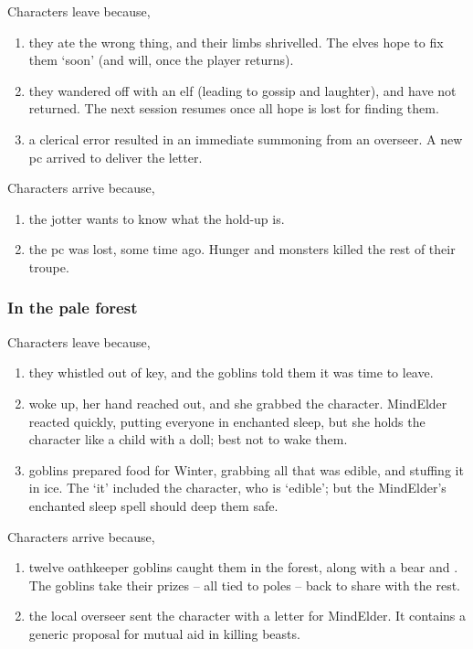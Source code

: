 \begin{multicols}{2}
{  Characters leave because,

  \begin{enumerate}
    \item
    they ate the wrong thing, and their limbs shrivelled.
    The elves hope to fix them `soon' (and will, once the player returns).
    \item
    they wandered off with an elf (leading to gossip and laughter), and have not returned.
    The next session resumes once all hope is lost for finding them.
    \item
    a clerical error resulted in an immediate summoning from an overseer.
    A new \gls{pc} arrived to deliver the letter.
  \end{enumerate}

  Characters arrive because,

  \begin{enumerate}
    \item
    the \gls{jotter} wants to know what the hold-up is.
    \item
    the \gls{pc} was lost, some time ago.
    Hunger and monsters killed the rest of their troupe.
  \end{enumerate}

  \subsubsection{In the pale forest}

  Characters leave because,

  \begin{enumerate}
    \item
    they whistled out of key, and the goblins told them it was time to leave.
    \item
     woke up, her hand reached out, and she grabbed the character.
    \gls{MindElder} reacted quickly, putting everyone in enchanted sleep, but she holds the character like a child with a doll; best not to wake them.
    \item
    goblins prepared food for Winter, grabbing all that was edible, and stuffing it in ice.
    The `it' included the character, who is `edible'; but the \gls{MindElder}'s enchanted sleep spell should deep them safe.
  \end{enumerate}

  Characters arrive because,

  \begin{enumerate}
    \item
    twelve oathkeeper goblins caught them in the forest, along with a bear and .
    The goblins take their prizes -- all tied to poles -- back to share with the rest.
    \item
    the local overseer sent the character with a letter for \gls{MindElder}.
    It contains a generic proposal for mutual aid in killing beasts.
  \end{enumerate}

}

\end{multicols}

